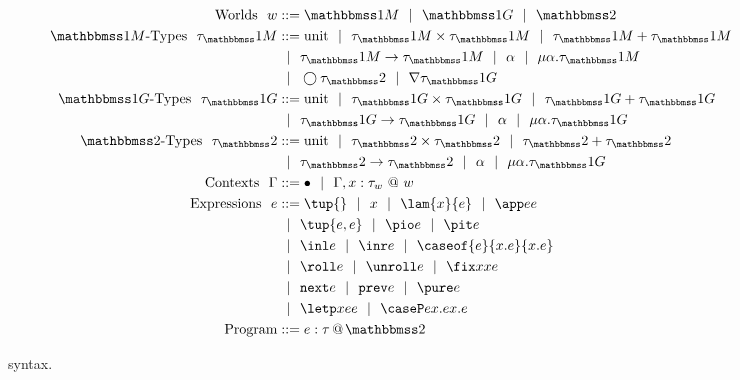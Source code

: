 
\begin{figure}
\begin{abstrsyn}
\[\begin{aligned}
\text{Worlds}\ \ 
\world &::= \bbonem \gbar \bbonep \gbar \bbtwo  \\
%
\text{\bbonem-Types}\ \ 
\type_\bbonem &::= \text{unit}
 \gbar \type_\bbonem \times \type_\bbonem
 \gbar \type_\bbonem + \type_\bbonem \\
&\gbar \type_\bbonem \to \type_\bbonem
 \gbar \alpha \gbar \mu \alpha.\tau_\bbonem \\
&\gbar \fut \type_\bbtwo
 \gbar \curr \type_\bbonep \\
%
\text{\bbonep-Types}\ \ 
\type_\bbonep &::= \text{unit}
 \gbar \type_\bbonep \times \type_\bbonep
 \gbar \type_\bbonep + \type_\bbonep \\
&\gbar \type_\bbonep \to \type_\bbonep
 \gbar \alpha \gbar \mu \alpha.\tau_\bbonep \\
%
\text{\bbtwo-Types}\ \ 
\type_\bbtwo &::= \text{unit}
 \gbar \type_\bbtwo \times \type_\bbtwo
 \gbar \type_\bbtwo + \type_\bbtwo \\
&\gbar \type_\bbtwo \to \type_\bbtwo
 \gbar \alpha \gbar \mu \alpha.\tau_\bbonep \\
%
%
\text{Contexts}\ \ 
\context &::=\emptyC
 \gbar \context, x:\tau_w~@~w \\
%
\text{Expressions}\ \ 
\expr &::= \tup{}\gbar\var%
 \gbar \lam {\var}{\expr} 
 \gbar \app \expr \expr \\
&\gbar \tup{\expr, \expr} 
 \gbar \pio \expr 
 \gbar \pit \expr \\
&\gbar \inl \expr 
 \gbar \inr \expr
 \gbar \caseof {\expr}{\var.\expr}{\var.\expr}
\\ %
&\gbar \roll e
 \gbar \unroll e
 \gbar \fix \var \var \expr\\
&\gbar \next \expr 
 \gbar \prev \expr
 \gbar \pure \expr \\
&\gbar \letp \var \expr \expr
 \gbar \caseP \expr {\var.\expr} {\var.\expr} \\
\text{Program} &::= \coltwo e \tau \\
\end{aligned}\]
\end{abstrsyn}
\caption{\lang~syntax.}
\label{fig:grammar}
\end{figure}
